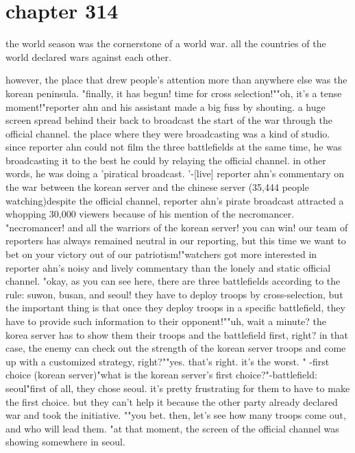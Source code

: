 \section{chapter 314}

the world season was the cornerstone of a world war.
 all the countries of the world declared wars against each other.





however, the place that drew people's attention more than anywhere else was the korean peninsula.
"finally, it has begun! time for cross selection!""oh, it's a tense moment!"reporter ahn and his assistant made a big fuss by shouting.
 a huge screen spread behind their back to broadcast the start of the war through the official channel.
the place where they were broadcasting was a kind of studio.
 since reporter ahn could not film the three battlefields at the same time, he was broadcasting it to the best he could by relaying the official channel.
 in other words, he was doing a 'piratical broadcast.
'-[live] reporter ahn's commentary on the war between the korean server and the chinese server (35,444 people watching)despite the official channel, reporter ahn's pirate broadcast attracted a whopping 30,000 viewers because of his mention of the necromancer.
"necromancer! and all the warriors of the korean server! you can win! our team of reporters has always remained neutral in our reporting, but this time we want to bet on your victory out of our patriotism!"watchers got more interested in reporter ahn's noisy and lively commentary than the lonely and static official channel.
 "okay, as you can see here, there are three battlefields according to the rule: suwon, busan, and seoul! they have to deploy troops by cross-selection, but the important thing is that once they deploy troops in a specific battlefield, they have to provide such information to their opponent!""uh, wait a minute? the korea server has to show them their troops and the battlefield first, right? in that case, the enemy can check out the strength of the korean server troops and come up with a customized strategy, right?""yes.
 that's right.
 it's the worst.
"
-first choice (korean server)"what is the korean server's first choice?"-battlefield: seoul"first of all, they chose seoul.
 it's pretty frustrating for them to have to make the first choice.
 but they can't help it because the other party already declared war and took the initiative.
""you bet.
 then, let's see how many troops come out, and who will lead them.
"at that moment, the screen of the official channel was showing somewhere in seoul.
